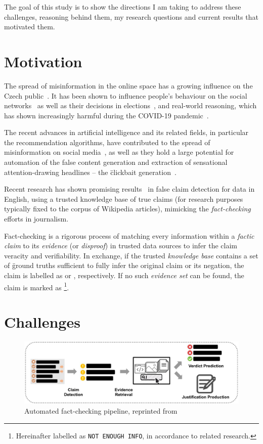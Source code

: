The goal of this study is to show the directions I am taking to address these challenges, reasoning behind them, my research questions and current results that motivated them.

\section{Motivation}
\label{sec:motivation}

The spread of misinformation in the online space has a growing influence on the Czech public~\cite{stem}. It has been shown to influence people's behaviour on the social networks~\cite{Lazer1094} as well as their decisions in elections~\cite{10.1257/jep.31.2.211}, and real-world reasoning, which has shown increasingly harmful during the COVID-19 pandemic~\cite{BARUA2020100119}.

The recent advances in artificial intelligence and its related fields, in particular the recommendation algorithms, have contributed to the spread of misinformation on social media~\cite{doi:10.1177/2056305119888654}, as well as they hold a large potential for automation of the false content generation and extraction of sensational attention-drawing headlines -- the \"{clickbait} generation~\cite{shukai}.

Recent research has shown promising results~\cite{fever2} in false claim detection for data in English, using a trusted knowledge base of true claims (for research purposes typically fixed to the corpus of \textsf{Wikipedia} articles), mimicking the \textit{fact-checking} efforts in journalism.

Fact-checking is a rigorous process of matching every information within a \textit{factic claim} to its \textit{evidence} (or \textit{disproof}) in trusted data sources to infer the claim veracity and verifiability. In exchange, if the trusted \textit{knowledge base} contains a set of \"{ground truths} sufficient to fully infer the original claim or its negation, the claim is labelled as {} or {}, respectively. If no such \textit{evidence set} can be found, the claim is marked as {}\footnote{Hereinafter labelled as \texttt{NOT ENOUGH INFO}, in accordance to related research.}.


\section{Challenges}

\begin{figure}
    \includegraphics[width=14cm]{fig/framework.pdf}
    \caption{Automated fact-checking pipeline, reprinted from~\cite{guo-etal-2022-survey}}
    \label{fig:framework}
\end{figure}

